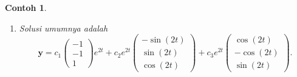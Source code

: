 \documentclass[a4paper]{article}
\theoremstyle{definisi}
\newtheorem{contoh}{Contoh}[subsection]
\numberwithin{equation}{section}
\begin{document}
\begin{contoh}
\begin{enumerate}[label=Langkah \arabic*: ,leftmargin=*]
\begin{align*}
      \end{align*}
      dan
      \begin{align*}
        \mathbf{y}_3(t) &= e^{2t}\left(\begin{pmatrix}0\\0\\1\end{pmatrix}\sin(2t) + \begin{pmatrix}1\\-1\\0\end{pmatrix}\cos(2t)\right)=\begin{pmatrix}\cos(2t)\\-\cos(2t)\\\sin(2t)\end{pmatrix}
      \end{align*}
      \item Solusi umumnya adalah
      \[\mathbf{y}=c_1\begin{pmatrix}-1\\-1\\1\end{pmatrix}e^{2t} + c_2e^{2t}\begin{pmatrix}-\sin(2t)\\\sin(2t)\\\cos(2t)\end{pmatrix} + c_3e^{2t}\begin{pmatrix}\cos(2t)\\-\cos(2t)\\\sin(2t)\end{pmatrix}.\]
    \end{enumerate}
  \end{contoh}
\end{document}
